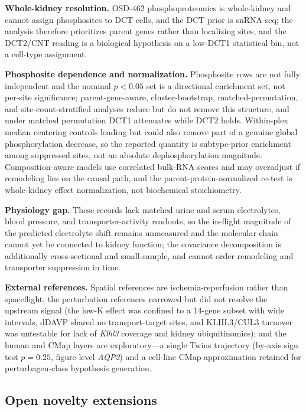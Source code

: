 \documentclass[11pt]{article}
\newcommand{\gene}[1]{\textit{#1}}
\begin{document}
\textbf{Whole-kidney resolution.} OSD-462 phosphoproteomics is whole-kidney and cannot assign phosphosites to DCT cells, and the DCT prior is snRNA-seq; the analysis therefore prioritizes parent genes rather than localizing sites, and the DCT2/CNT reading is a biological hypothesis on a low-DCT1 statistical bin, not a cell-type assignment.

\textbf{Phosphosite dependence and normalization.} Phosphosite rows are not fully independent and the nominal $p<0.05$ set is a directional enrichment set, not per-site significance; parent-gene-aware, cluster-bootstrap, matched-permutation, and site-count-stratified analyses reduce but do not remove this structure, and under matched permutation DCT1 attenuates while DCT2 holds. Within-plex median centering controls loading but could also remove part of a genuine global phosphorylation decrease, so the reported quantity is subtype-prior enrichment among suppressed sites, not an absolute dephosphorylation magnitude. Composition-aware models use correlated bulk-RNA scores and may overadjust if remodeling lies on the causal path, and the parent-protein-normalized re-test is whole-kidney effect normalization, not biochemical stoichiometry.

\textbf{Physiology gap.} These records lack matched urine and serum electrolytes, blood pressure, and transporter-activity readouts, so the in-flight magnitude of the predicted electrolyte shift remains unmeasured and the molecular chain cannot yet be connected to kidney function; the covariance decomposition is additionally cross-sectional and small-sample, and cannot order remodeling and transporter suppression in time.

\textbf{External references.} Spatial references are ischemia-reperfusion rather than spaceflight; the perturbation references narrowed but did not resolve the upstream signal (the low-K effect was confined to a 14-gene subset with wide intervals, dDAVP shared no transport-target sites, and KLHL3/CUL3 turnover was untestable for lack of \gene{Klhl3} coverage and kidney ubiquitinomics); and the human and CMap layers are exploratory---a single Twins trajectory (by-axis sign test $p=0.25$, figure-level \gene{AQP2}) and a cell-line CMap approximation retained for perturbagen-class hypothesis generation.

\subsection{Open novelty extensions}
\end{document}
